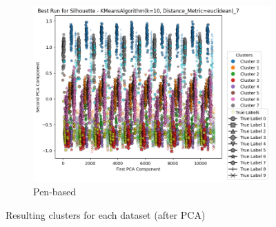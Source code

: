 \begin{figure}[H]
\begin{subfigure}{0.32\textwidth}
        \includegraphics[width=\linewidth]{figures/KMeans/penbased_best_run_Silhouette.png}
        \caption{Pen-based}
    \end{subfigure}
    \caption{Resulting clusters for each dataset (after PCA)}
    \label{fig:kmeans:clusters}
\end{figure}
